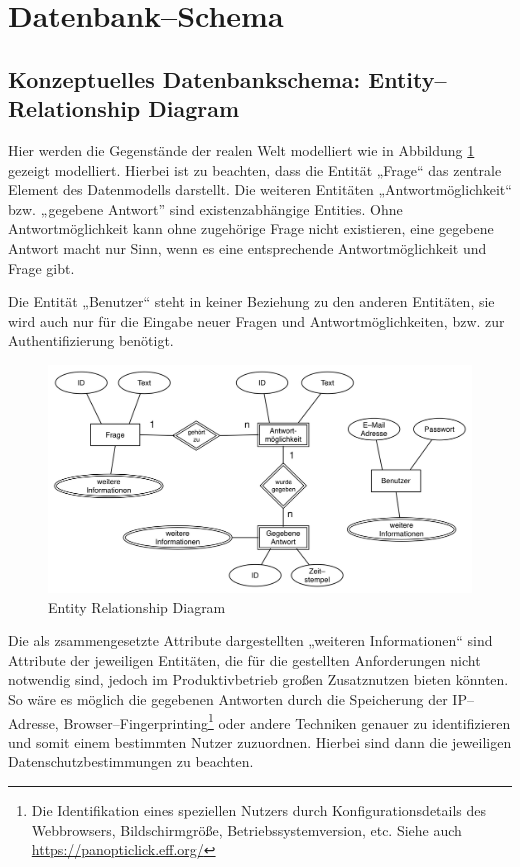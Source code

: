 \section{Datenbank--Schema}

\subsection{Konzeptuelles Datenbankschema: Entity--Relationship Diagram}

Hier werden die Gegenstände der realen Welt modelliert wie in Abbildung \ref{fig:erd} gezeigt modelliert. Hierbei ist zu beachten, dass die Entität „Frage“ das zentrale Element des Datenmodells darstellt. Die weiteren Entitäten „Antwortmöglichkeit“ bzw. „gegebene Antwort” sind existenzabhängige Entities. Ohne Antwortmöglichkeit kann ohne zugehörige Frage nicht existieren, eine gegebene Antwort macht nur Sinn, wenn es eine entsprechende Antwortmöglichkeit und Frage gibt.

Die Entität „Benutzer“ steht in keiner Beziehung zu den anderen Entitäten, sie wird auch nur für die Eingabe neuer Fragen und Antwortmöglichkeiten, bzw. zur Authentifizierung benötigt.

\begin{figure}[H]
\begin{center}
\includegraphics[width=\textwidth]{ERD.jpg}
\caption{Entity Relationship Diagram}
\end{center}
\label{fig:erd}
\end{figure}

Die als zsammengesetzte Attribute dargestellten „weiteren Informationen“ sind Attribute der jeweiligen Entitäten, die für die gestellten Anforderungen nicht notwendig sind, jedoch im Produktivbetrieb großen Zusatznutzen bieten könnten. So wäre es möglich die gegebenen Antworten durch die Speicherung der IP--Adresse, Browser--Fingerprinting\footnote{Die Identifikation eines speziellen Nutzers durch Konfigurationsdetails des Webbrowsers, Bildschirmgröße, Betriebssystemversion, etc. Siehe auch \url{https://panopticlick.eff.org/}} oder andere Techniken genauer zu identifizieren und somit einem bestimmten Nutzer zuzuordnen. Hierbei sind dann die jeweiligen Datenschutzbestimmungen zu beachten.

